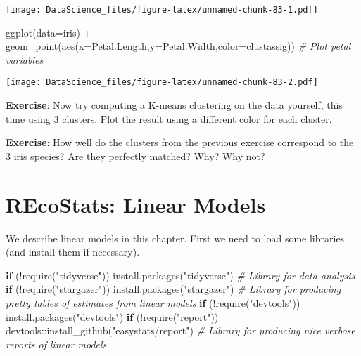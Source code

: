 \documentclass[
]{book}
\newenvironment{Shaded}{\begin{snugshade}}{\end{snugshade}}
\newcommand{\AttributeTok}[1]{\textcolor[rgb]{0.77,0.63,0.00}{#1}}
\newcommand{\CommentTok}[1]{\textcolor[rgb]{0.56,0.35,0.01}{\textit{#1}}}
\newcommand{\ControlFlowTok}[1]{\textcolor[rgb]{0.13,0.29,0.53}{\textbf{#1}}}
\newcommand{\FunctionTok}[1]{\textcolor[rgb]{0.00,0.00,0.00}{#1}}
\newcommand{\NormalTok}[1]{#1}
\newcommand{\SpecialCharTok}[1]{\textcolor[rgb]{0.00,0.00,0.00}{#1}}
\newcommand{\StringTok}[1]{\textcolor[rgb]{0.31,0.60,0.02}{#1}}
\begin{document}
\texttt{[image: DataScience\_files/figure-latex/unnamed-chunk-83-1.pdf]}

\begin{Shaded}
\begin{Highlighting}[]
\FunctionTok{ggplot}\NormalTok{(}\AttributeTok{data=}\NormalTok{iris) }\SpecialCharTok{+} \FunctionTok{geom\_point}\NormalTok{(}\FunctionTok{aes}\NormalTok{(}\AttributeTok{x=}\NormalTok{Petal.Length,}\AttributeTok{y=}\NormalTok{Petal.Width,}\AttributeTok{color=}\NormalTok{clustassig)) }\CommentTok{\# Plot petal variables}
\end{Highlighting}
\end{Shaded}

\texttt{[image: DataScience\_files/figure-latex/unnamed-chunk-83-2.pdf]}

\textbf{Exercise}: Now try computing a K-means clustering on the data yourself, this time using 3 clusters. Plot the result using a different color for each cluster.

\textbf{Exercise}: How well do the clusters from the previous exercise correspond to the 3 iris species? Are they perfectly matched? Why? Why not?

\hypertarget{recostats-linear-models}{%
\chapter{REcoStats: Linear Models}\label{recostats-linear-models}}

We describe linear models in this chapter. First we need to load some libraries (and install them if necessary).

\begin{Shaded}
\begin{Highlighting}[]
\ControlFlowTok{if}\NormalTok{ (}\SpecialCharTok{!}\FunctionTok{require}\NormalTok{(}\StringTok{"tidyverse"}\NormalTok{)) }\FunctionTok{install.packages}\NormalTok{(}\StringTok{"tidyverse"}\NormalTok{) }\CommentTok{\# Library for data analysis}
\ControlFlowTok{if}\NormalTok{ (}\SpecialCharTok{!}\FunctionTok{require}\NormalTok{(}\StringTok{"stargazer"}\NormalTok{)) }\FunctionTok{install.packages}\NormalTok{(}\StringTok{"stargazer"}\NormalTok{) }\CommentTok{\# Library for producing pretty tables of estimates from linear models}
\ControlFlowTok{if}\NormalTok{ (}\SpecialCharTok{!}\FunctionTok{require}\NormalTok{(}\StringTok{"devtools"}\NormalTok{)) }\FunctionTok{install.packages}\NormalTok{(}\StringTok{"devtools"}\NormalTok{)}
\ControlFlowTok{if}\NormalTok{ (}\SpecialCharTok{!}\FunctionTok{require}\NormalTok{(}\StringTok{"report"}\NormalTok{)) devtools}\SpecialCharTok{::}\FunctionTok{install\_github}\NormalTok{(}\StringTok{"easystats/report"}\NormalTok{) }\CommentTok{\# Library for producing nice verbose reports of linear models}
\end{Highlighting}
\end{Shaded}
\end{document}
